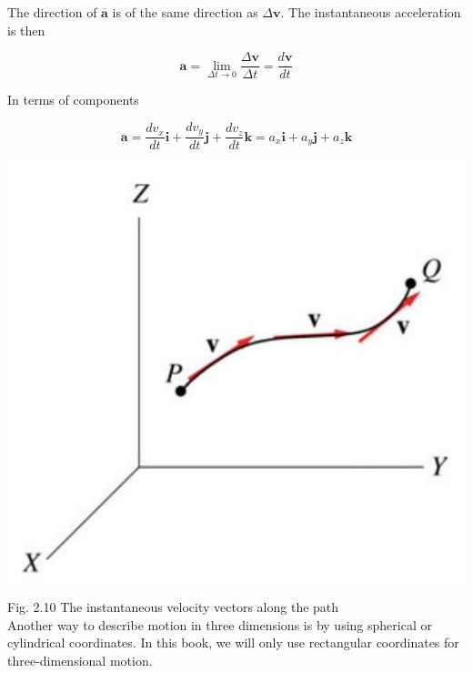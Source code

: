 \documentclass[10pt]{article}
\begin{document}
The direction of $\overline{\mathbf{a}}$ is of the same direction as $\Delta \mathbf{v}$. The instantaneous acceleration is then

$$
\mathbf{a}=\lim _{\Delta t \rightarrow 0} \frac{\Delta \mathbf{v}}{\Delta t}=\frac{d \mathbf{v}}{d t}
$$

In terms of components

$$
\mathbf{a}=\frac{d v_{x}}{d t} \mathbf{i}+\frac{d v_{y}}{d t} \mathbf{j}+\frac{d v_{z}}{d t} \mathbf{k}=a_{x} \mathbf{i}+a_{y} \mathbf{j}+a_{z} \mathbf{k}
$$

\begin{center}
\includegraphics[max width=\textwidth]{2024_09_13_db1f357d2aad0a03eb2eg-031}
\end{center}

Fig. 2.10 The instantaneous velocity vectors along the path\\
Another way to describe motion in three dimensions is by using spherical or cylindrical coordinates. In this book, we will only use rectangular coordinates for three-dimensional motion.
\end{document}
